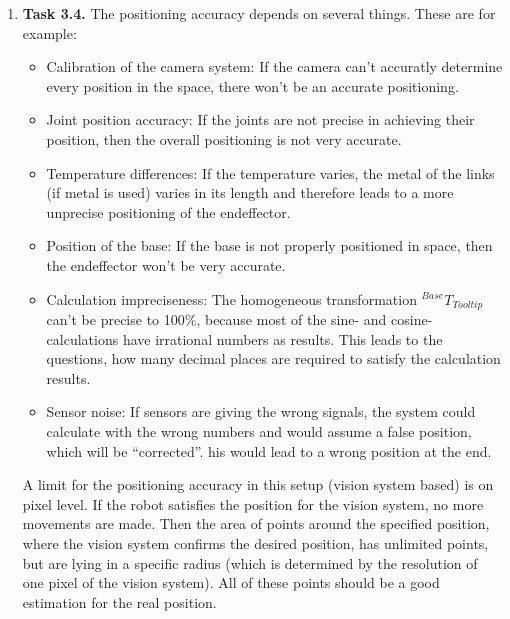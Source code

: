\documentclass[a4paper,11pt]{article}
\begin{document}
\begin {enumerate}
\begin{enumerate}
        \item[4)]
    \end{enumerate}

\item[\textbf{Task 3.4.}] The positioning accuracy depends on several things. These are for example:

\begin{itemize}
  \item Calibration of the camera system: If the camera can't accuratly determine every position in the space, there won't be an accurate positioning.
  \item Joint position accuracy: If the joints are not precise in achieving their position, then the overall positioning is not very accurate.
  \item Temperature differences: If the temperature varies, the metal of the links (if metal is used) varies in its length and therefore leads to a more unprecise positioning of the endeffector.
  \item Position of the base: If the base is not properly positioned in space, then the endeffector won't be very accurate.
  \item Calculation impreciseness: The homogeneous transformation ${^{Base}T_{Tooltip}}$ can't be precise to 100\%, because most of the sine- and cosine-calculations have irrational numbers as results. This leads to the questions, how many decimal places are required to satisfy the calculation results.
  \item Sensor noise: If sensors are giving the wrong signals, the system could calculate with the wrong numbers and would assume a false position, which will be ``corrected''. his would lead to a wrong position at the end.
\end{itemize}

A limit for the positioning accuracy in this setup (vision system based) is on pixel level. If the robot satisfies the position for the vision system, no more movements are made. Then the area of points around the specified position, where the vision system confirms the desired position, has unlimited points, but are lying in a specific radius (which is determined by the resolution of one pixel of the vision system). All of these points should be a good estimation for the real position.

\end {enumerate}
\end{document}
